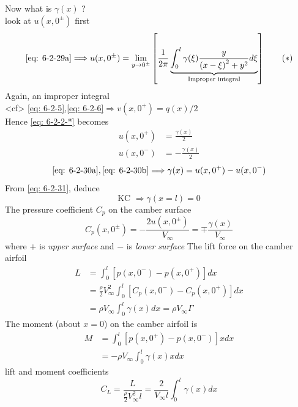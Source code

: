 \begin{itemize}
Now what is $\gamma(x)$ ?\\
look at $u(x,0^{\pm})$ first
\begin{equation}
\eqref{eq: 6-2-29a}\Longrightarrow
u(x,0^{\pm}) = \lim_{y\to 0^{\pm}}\left[\frac{1}{2\pi}\underbrace{\int_0^l\gamma(\xi)\frac{y}{\left(x-\xi\right)^2 + y^2}d\xi}_{\text{Improper integral}}\right]
\tag{$\ast$} \label{eq: 6-2-2-*}
\end{equation}
Again, an improper integral\\
<cf> \eqref{eq: 6-2-5},\eqref{eq: 6-2-6}$\Longrightarrow v(x,0^{+}) = q(x)/2$\\
Hence \eqref{eq: 6-2-2-*} becomes
\begin{subequations}
\label{eq: 6-2-30}
\begin{align}
u(x,0^+) &= \frac{\gamma(x)}{2} \label{eq: 6-2-30a}\\
u(x,0^-) &= -\frac{\gamma(x)}{2} \label{eq: 6-2-30b}
\end{align}
\end{subequations}
\begin{equation}
\eqref{eq: 6-2-30a},\eqref{eq: 6-2-30b}\Longrightarrow\gamma(x) = u(x,0^+)-u(x,0^-)
\label{eq: 6-2-31}
\end{equation}
From \eqref{eq: 6-2-31}, deduce
\begin{equation}
\text{KC }\Longrightarrow\gamma(x=l) = 0
\label{eq: 6-2-32}
\end{equation}
The pressure coefficient $C_p$ on the camber surface
\begin{equation}
C_p(x,0^{\pm}) = -\frac{2u(x,0^\pm)}{V_\infty} = \mp\frac{\gamma(x)}{V_\infty}
\end{equation}
where $+$ is \emph{upper surface} and $-$ is \emph{lower surface}
The lift force on the camber airfoil 
\begin{align*}
L 
&= \int_0^l\left[p(x,0^-)-p(x,0^+)\right]dx \\
&= \frac{\rho}{2}V_\infty^2\int_0^l\left[C_p(x,0^-)-C_p(x,0^+)\right]dx \\
&=\rho V_\infty\int_0^l\gamma(x)dx=\rho V_\infty\Gamma
\end{align*}
The moment (about $x=0$) on the camber airfoil is
\begin{align}
M
&= \int_0^l\left[p(x,0^+)-p(x,0^-)\right]xdx \nonumber\\
&= -\rho V_\infty\int_0^l\gamma(x)xdx\label{eq: 6-2-35}
\end{align}
lift and moment coefficients
\begin{equation}
C_L = \frac{L}{\frac{\rho}{2}V_\infty^2l} = \frac{2}{V_\infty l}\int_0^l\gamma(x)dx

\end{equation}
\end{itemize}
